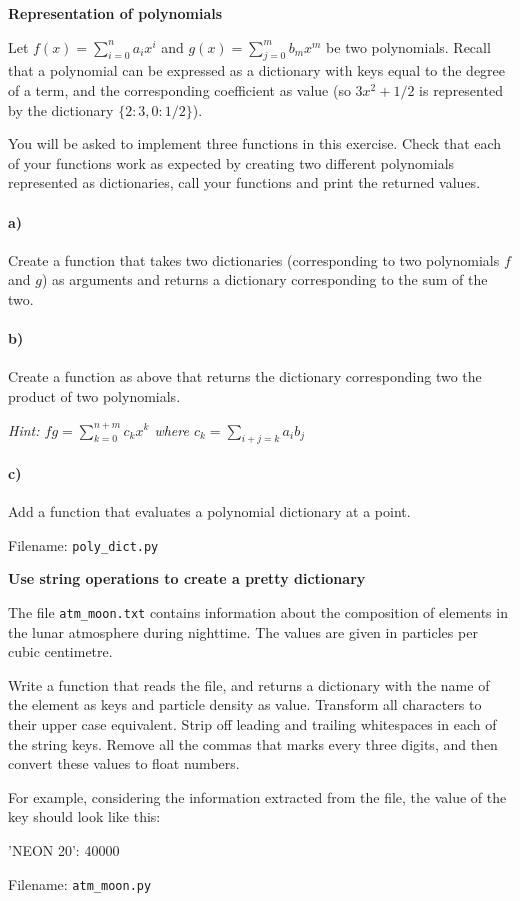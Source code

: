 \begin{Problem}{\textbf{Representation of polynomials}} \label{prob62}

\noindent Let $f(x)=\sum_{i=0}^n a_ix^i$ and $g(x)=\sum_{j=0}^mb_mx^m$ be two polynomials.
Recall that a polynomial can be expressed as a dictionary with keys equal to the
degree of a term, and the corresponding coefficient as value (so $3x^2+1/2$ is represented
by the dictionary $\{2: 3, 0: 1/2\}$). 

You will be asked to implement three functions in this exercise. Check that each of your functions work as expected by creating two different polynomials represented as dictionaries, call your functions and print the returned values.

\paragraph{a)}
Create a function that takes two dictionaries (corresponding to two polynomials
$f$ and $g$) as arguments and returns a dictionary corresponding to the sum of the two.

\paragraph{b)}
Create a function as above that returns the dictionary corresponding two the
product of two polynomials.

\emph{Hint: $fg=\sum_{k=0}^{n+m} c_kx^k$ where $c_k=\sum_{i+j=k}a_ib_j$}

\paragraph{c)}
Add a function that evaluates a polynomial dictionary at a point. 

Filename: \texttt{poly\_dict.py}
\end{Problem}

\begin{Problem} \textbf{Use string operations to create a pretty dictionary}

\noindent
The file \texttt{atm\_moon.txt} contains information about the composition of elements in the lunar atmosphere during nighttime. \cite{moon} The values are given in particles per cubic centimetre.


Write a function that reads the file, and returns a dictionary with the name of the element as keys and particle density as value. Transform all characters to their upper case equivalent. Strip off leading and trailing whitespaces in each of the string keys. Remove all the commas that marks every three digits, and then convert these values to float numbers.

For example, considering the information  extracted from the file,
the value of the key  should look like this:
\begin{python}
'NEON 20': 40000
\end{python}

Filename: \texttt{atm\_moon.py}
\end{Problem}

